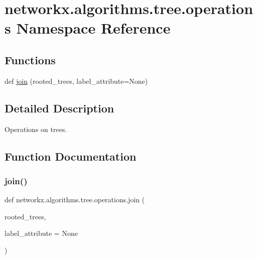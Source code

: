 \hypertarget{namespacenetworkx_1_1algorithms_1_1tree_1_1operations}{}\section{networkx.\+algorithms.\+tree.\+operations Namespace Reference}
\label{namespacenetworkx_1_1algorithms_1_1tree_1_1operations}
\subsection*{Functions}
\begin{DoxyCompactItemize}
\item 
def \hyperlink{namespacenetworkx_1_1algorithms_1_1tree_1_1operations_a7ece3c31ad90d1de461efaf2d3884d43}{join} (rooted\+\_\+trees, label\+\_\+attribute=None)
\end{DoxyCompactItemize}


\subsection{Detailed Description}
\begin{DoxyVerb}Operations on trees.\end{DoxyVerb}
 

\subsection{Function Documentation}
\mbox{\label{namespacenetworkx_1_1algorithms_1_1tree_1_1operations_a7ece3c31ad90d1de461efaf2d3884d43}} 
\subsubsection{\texorpdfstring{join()}{join()}}
{\footnotesize\ttfamily def networkx.\+algorithms.\+tree.\+operations.\+join (\begin{DoxyParamCaption}\item[{}]{rooted\+\_\+trees,  }\item[{}]{label\+\_\+attribute = {\ttfamily None} }\end{DoxyParamCaption})}

